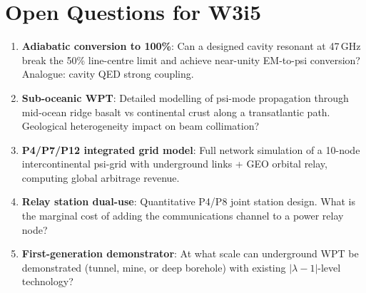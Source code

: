 \documentclass[aps,prd,twocolumn,superscriptaddress]{revtex4-2}
\newcommand{\lambdaone}{|\lambda{-}1|}
\begin{document}
\section{Open Questions for W3i5}
\label{sec:open}

\begin{enumerate}
\item \textbf{Adiabatic conversion to 100\%}: Can a designed cavity
  resonant at 47\,GHz break the 50\% line-centre limit and achieve
  near-unity EM-to-psi conversion?  Analogue: cavity QED strong coupling.
\item \textbf{Sub-oceanic WPT}: Detailed modelling of psi-mode propagation
  through mid-ocean ridge basalt vs continental crust along a
  transatlantic path.  Geological heterogeneity impact on beam collimation?
\item \textbf{P4/P7/P12 integrated grid model}: Full network
  simulation of a 10-node intercontinental psi-grid with
  underground links + GEO orbital relay, computing global
  arbitrage revenue.
\item \textbf{Relay station dual-use}: Quantitative P4/P8 joint
  station design.  What is the marginal cost of adding the
  communications channel to a power relay node?
\item \textbf{First-generation demonstrator}: At what scale
  can underground WPT be demonstrated (tunnel, mine, or
  deep borehole) with existing $\lambdaone$-level technology?
\end{enumerate}
\end{document}
